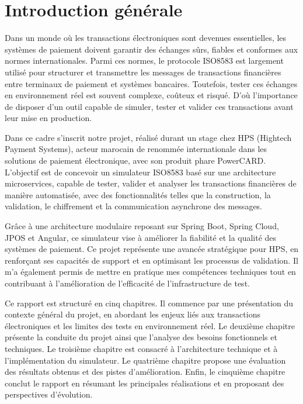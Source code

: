 \chapter*{Introduction générale}
Dans un monde où les transactions électroniques sont devenues essentielles, les systèmes de paiement doivent garantir des échanges sûrs, fiables et conformes aux normes internationales. Parmi ces normes, le protocole ISO8583 est largement utilisé pour structurer et transmettre les messages de transactions financières entre terminaux de paiement et systèmes bancaires. Toutefois, tester ces échanges en environnement réel est souvent complexe, coûteux et risqué. D’où l’importance de disposer d’un outil capable de simuler, tester et valider ces transactions avant leur mise en production.

Dans ce cadre s’inscrit notre projet, réalisé durant un stage chez HPS (Hightech Payment Systems), acteur marocain de renommée internationale dans les solutions de paiement électronique, avec son produit phare PowerCARD. L’objectif est de concevoir un simulateur ISO8583 basé sur une architecture microservices, capable de tester, valider et analyser les transactions financières de manière automatisée, avec des fonctionnalités telles que la construction, la validation, le chiffrement et la communication asynchrone des messages.

Grâce à une architecture modulaire reposant sur Spring Boot, Spring Cloud, JPOS et Angular, ce simulateur vise à améliorer la fiabilité et la qualité des systèmes de paiement. Ce projet représente une avancée stratégique pour HPS, en renforçant ses capacités de support et en optimisant les processus de validation. Il m'a également permis de mettre en pratique mes compétences techniques tout en contribuant à l'amélioration de l'efficacité de l’infrastructure de test.

Ce rapport est structuré en cinq chapitres. Il commence par une présentation du contexte général du projet, en abordant les enjeux liés aux transactions électroniques et les limites des tests en environnement réel. Le deuxième chapitre présente la conduite du projet ainsi que l’analyse des besoins fonctionnels et techniques. Le troisième chapitre est consacré à l’architecture technique et à l’implémentation du simulateur. Le quatrième chapitre propose une évaluation des résultats obtenus et des pistes d’amélioration. Enfin, le cinquième chapitre conclut le rapport en résumant les principales réalisations et en proposant des perspectives d’évolution.

